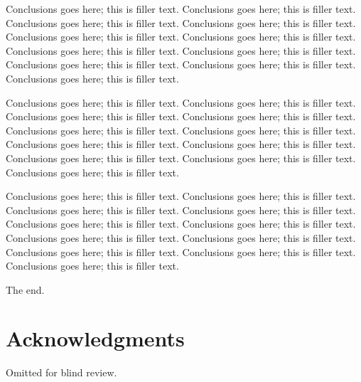 \documentclass{sig-alternate}
\begin{document}
Conclusions goes here; this is filler text. Conclusions goes here; this is filler text. Conclusions goes here; this is filler text. Conclusions goes here; this is filler text. Conclusions goes here; this is filler text. Conclusions goes here; this is filler text. Conclusions goes here; this is filler text. Conclusions goes here; this is filler text. Conclusions goes here; this is filler text. Conclusions goes here; this is filler text. Conclusions goes here; this is filler text. 

Conclusions goes here; this is filler text. Conclusions goes here; this is filler text. Conclusions goes here; this is filler text. Conclusions goes here; this is filler text. Conclusions goes here; this is filler text. Conclusions goes here; this is filler text. Conclusions goes here; this is filler text. Conclusions goes here; this is filler text. Conclusions goes here; this is filler text. Conclusions goes here; this is filler text. Conclusions goes here; this is filler text. 

Conclusions goes here; this is filler text. Conclusions goes here; this is filler text. Conclusions goes here; this is filler text. Conclusions goes here; this is filler text. Conclusions goes here; this is filler text. Conclusions goes here; this is filler text. Conclusions goes here; this is filler text. Conclusions goes here; this is filler text. Conclusions goes here; this is filler text. Conclusions goes here; this is filler text. Conclusions goes here; this is filler text. 

The end.


\section{Acknowledgments}
Omitted for blind review.
\end{document}
